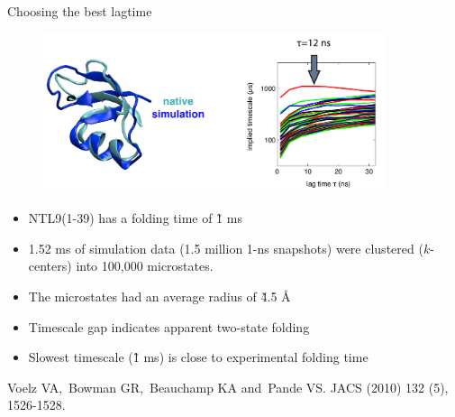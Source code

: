 \documentclass{beamer}
\begin{document}
\begin{frame}{Choosing the best lagtime}

\begin{figure}
\includegraphics[width=0.9\textwidth]{ntl9-lagtimes}
\end{figure}

\begin{itemize}
    \item NTL9(1-39) has a folding time of \~1 ms
    \item 1.52 ms of simulation data (1.5 million 1-ns snapshots) were clustered ($k$-centers) into 100,000 microstates. 
    \item The microstates had an average radius of \~4.5 \AA
    \item Timescale gap indicates apparent two-state folding
    \item Slowest timescale (\~1 ms) is close to experimental folding time
\end{itemize}

\tiny
Voelz VA, Bowman GR, Beauchamp KA and Pande VS. JACS (2010) 132 (5), 1526-1528.
\normalsize

\end{frame}
\end{document}
